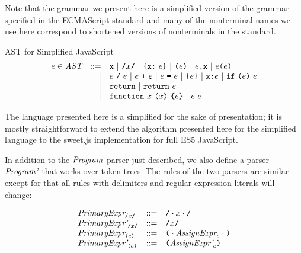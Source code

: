 \documentclass[preprint,10pt]{sigplanconf}
\begin{document}
Note that the grammar we present here is a simplified version of the
grammar specified in the ECMAScript standard \cite{International2011}
and many of the nonterminal names we use here correspond to shortened
versions of nonterminals in the standard.


\begin{displayfigure}{\label{fig:ast}AST for Simplified JavaScript}
\[
\begin{array}{rrl}
  e \in \textit{AST} &::=& \texttt{x} ~|~ \texttt{/}x\texttt{/} ~|~ \texttt{\{}\texttt{x}\texttt{:}~e\texttt{\}} ~|~ \texttt{(}e\texttt{)}
  ~|~ e\texttt{.}\texttt{x} ~|~ e\texttt{(}e\texttt{)}
  \\
  &|& e~\texttt{/}~e ~|~ e ~\texttt{+}~ e ~|~ e ~\texttt{=}~ e
  ~|~ \texttt{\{}e\texttt{\}} ~|~ \texttt{x} \texttt{:} e ~|~ \texttt{if}~\texttt{(}e\texttt{)}~e
  \\ 
  &|& \texttt{return} ~|~ \texttt{return}~e
  \\
  &|& \texttt{function}~x~\texttt{(}x\texttt{)}~\texttt{\{}e\texttt{\}} ~|~ e~e
\end{array}
\]
\end{displayfigure}

The language presented here is a simplified for the sake of
presentation; it is mostly straightforward to extend the algorithm
presented here for the simplified language to 
the sweet.js implementation for full ES5 JavaScript.

In addition to the \( \textit{Program}_{} \) parser just described, we
also define a parser \( \textit{Program'}_{} \) that works over token
trees. The rules of the two parsers are similar except for that
all rules with delimiters and regular expression literals will change:

\[
\begin{array}{lcl}
  \textit{PrimaryExpr}_{\texttt{/}x\texttt{/}} &::=& \texttt{/}\cdot x \cdot \texttt{/}
  \\
  \textit{PrimaryExpr'}_{\texttt{/}x\texttt{/}} &::=& \texttt{/}x\texttt{/}
  \\
  \textit{PrimaryExpr}_{\texttt{(}e\texttt{)}} &::=& 
  \texttt{(} \cdot \textit{AssignExpr}_{e} \cdot \texttt{)}
  \\
  \textit{PrimaryExpr'}_{\texttt{(}e\texttt{)}} &::=& 
  \texttt{(}\textit{AssignExpr'}_{e}\texttt{)}
  \\
\end{array}
\]
\end{document}
